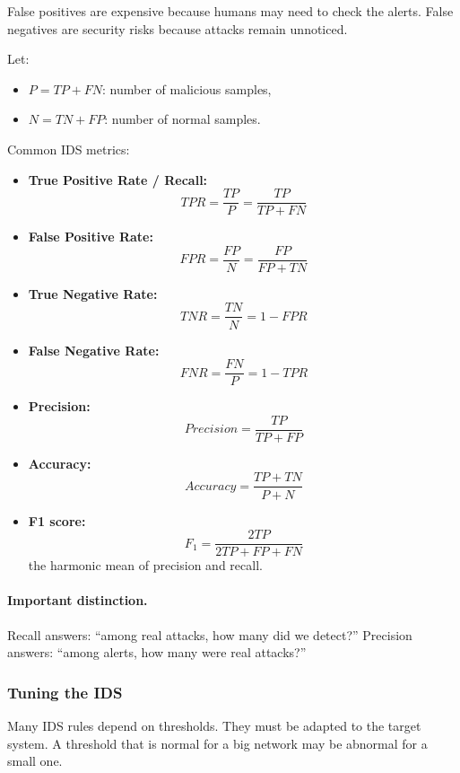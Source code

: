 False positives are expensive because humans may need to check the alerts. False negatives are security risks because attacks remain unnoticed.

Let:
\begin{itemize}
    \item $P = TP + FN$: number of malicious samples,
    \item $N = TN + FP$: number of normal samples.
\end{itemize}

Common IDS metrics:

\begin{itemize}
    \item \textbf{True Positive Rate / Recall:}
    \[
        TPR = \frac{TP}{P} = \frac{TP}{TP + FN}
    \]

    \item \textbf{False Positive Rate:}
    \[
        FPR = \frac{FP}{N} = \frac{FP}{FP + TN}
    \]

    \item \textbf{True Negative Rate:}
    \[
        TNR = \frac{TN}{N} = 1 - FPR
    \]

    \item \textbf{False Negative Rate:}
    \[
        FNR = \frac{FN}{P} = 1 - TPR
    \]

    \item \textbf{Precision:}
    \[
        Precision = \frac{TP}{TP + FP}
    \]

    \item \textbf{Accuracy:}
    \[
        Accuracy = \frac{TP + TN}{P + N}
    \]

    \item \textbf{F1 score:}
    \[
        F_1 = \frac{2TP}{2TP + FP + FN}
    \]
	the harmonic mean of precision and recall.
\end{itemize}

\paragraph{Important distinction.}
Recall answers: ``among real attacks, how many did we detect?''  
Precision answers: ``among alerts, how many were real attacks?''

\subsubsection{Tuning the IDS}


Many IDS rules depend on thresholds. They must be adapted to the target system. A threshold that is normal for a big network may be abnormal for a small one.

